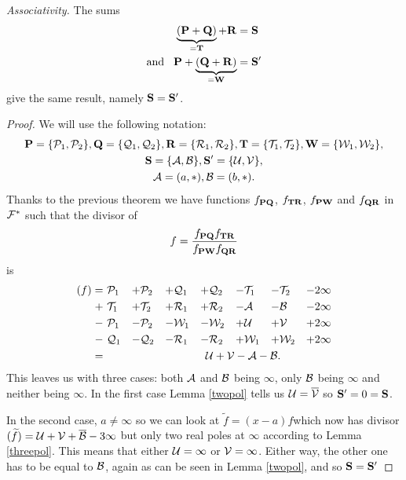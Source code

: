 \documentclass[english,11pt,a4paper]{article}
\begin{document}
\begin{theorem}
  \textit{Associativity.} The sums
  \begin{align*}
  \underbrace{(\P + \Q)}_{= \T} + \R &= \S \\
  \text{and\hspace{3mm}}\P + \underbrace{(\Q + \R)}_{=\W} &= \S'
  \end{align*}
  give the same result, namely $\S = \S'$.

  \begin{proof}
    We will use the following notation:
    \begin{gather*}
    \P=\{\p_1,\p_2\}, 
    \Q=\{\q_1,\q_2\}, 
    \R=\{\r_1,\r_2\}, 
    \T=\{\t_1,\t_2\}, 
    \W=\{\w_1,\w_2\},
    \\
    \S = \{\a, \b \}, 
    \S' = \{\u, \v \},
    \\
    \a = (a,*), \b = (b,*).
    \end{gather*}
    Thanks to the previous theorem we have functions $f_{\P \Q}$, $f_{\T \R}$, $f_{\P \W}$ and $f_{\Q \R}$ in $\F^*$ such that the divisor of
    \begin{align*}
      f = \frac{f_{\P \Q} f_{\T \R}}{f_{\P \W} f_{\Q \R}} 
    \end{align*}
    is\vspace{-8mm}
    \begin{alignat*}{7}
      (f)
      = & \ \p_1 &+{}& \p_2 &+{}& \q_1 &+{}& \q_2 &-{}& \t_1 &-{}& \t_2 &-{}& 2 \infty \\
      + & \ \t_1 &+{}& \t_2 &+{}& \r_1 &+{}& \r_2 &-{}& \a   &-{}& \b   &-{}& 2 \infty \\
      - & \ \p_1 &-{}& \p_2 &-{}& \w_1 &-{}& \w_2 &+{}& \u   &+{}& \v   &+{}& 2 \infty \\
      - & \ \q_1 &-{}& \q_2 &-{}& \r_1 &-{}& \r_2 &+{}& \w_1 &+{}& \w_2 &+{}& 2 \infty \\
      = &&&&&&&&&&&&& \hspace{-35mm} \u + \v - \a - \b.
    \end{alignat*}
    This leaves us with three cases: both $\a$ and $\b$ being $\infty$, only $\b$ being $\infty$ and neither being $\infty$. In the first case Lemma \ref{twopol} tells us $\u = \bar \v$ so $\S' = 0 = \S$.

    In the second case, $a \neq \infty$ so we can look at $\tilde f = (x - a) f$which now has divisor $(\tilde f) = \u + \v + \bar \b - 3 \infty$ but only two real poles at $\infty$ according to Lemma \ref{threepol}. This means that either $\u = \infty$ or $\v = \infty$. Either way, the other one has to be equal to $\b$, again as can be seen in Lemma \ref{twopol}, and so $\S = \S'$


\end{proof}
\end{theorem}
\end{document}
